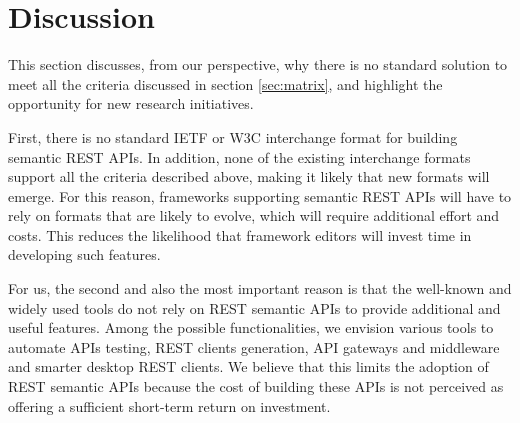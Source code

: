 \section{Discussion} \label{sec:discussion}

\vspace*{-0.2cm}


This section discusses, from our perspective, why there is no standard solution to meet all the criteria discussed in section \ref{sec:matrix}, and highlight the opportunity for new research initiatives. 

First, there is no standard IETF or W3C interchange format for building semantic REST APIs. In addition, none of the existing interchange formats support all the criteria described above, making it likely that new formats will emerge.
For this reason, frameworks supporting semantic REST APIs will have to rely on formats that are likely to evolve, which will require additional effort and costs. This reduces the likelihood that framework editors will invest time in developing such features. 

For us, the second and also the most important reason is that the well-known and widely used tools do not rely on REST semantic APIs to provide additional and useful features. Among the possible functionalities, we envision various tools to automate APIs testing, REST clients generation, API gateways and middleware and smarter desktop REST clients.
We believe that this limits the adoption of REST semantic APIs because the cost of building these APIs is not perceived as offering a sufficient short-term return on investment.



